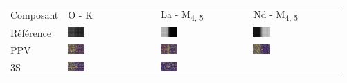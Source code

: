 \begin{tabular}{m{}*{3}{M{0.21\textwidth}}}
Composant&O - K&La - M\textsubscript{4, 5}&Nd - M\textsubscript{4, 5}\\
Référence
&\includegraphics[width=0.2\textwidth]{img/chapitre4/figure15/synth/Synth_GT_band_0.png}
&\includegraphics[width=0.2\textwidth]{img/chapitre4/figure15/synth/Synth_GT_band_1.png}
&\includegraphics[width=0.2\textwidth]{img/chapitre4/figure15/synth/Synth_GT_band_2.png}
\\
PPV
&\includegraphics[width=0.2\textwidth]{img/chapitre4/figure15/synth/Synth_interpolation_band_0.png}
&\includegraphics[width=0.2\textwidth]{img/chapitre4/figure15/synth/Synth_interpolation_band_1.png}
&\includegraphics[width=0.2\textwidth]{img/chapitre4/figure15/synth/Synth_interpolation_band_2.png}
\\
3S
&\includegraphics[width=0.2\textwidth]{img/chapitre4/figure15/synth/Synth_3S_band_0.png}
&\includegraphics[width=0.2\textwidth]{img/chapitre4/figure15/synth/Synth_3S_band_1.png}

\end{tabular}
